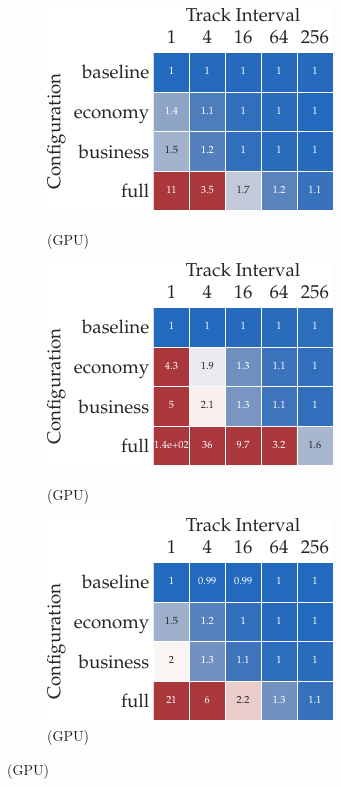 \captionsetup[subfigure]{justification=justified,singlelinecheck=false}

\begin{figure}[t]
  \centering
  \begin{subfigure}[t]{0.35\linewidth}
    \centering
    \caption{\mnist \MNISTNET (GPU)}
    \includegraphics{../repos/cockpit-paper/fig/01_benchmark/output/fig_grid/benchmark_mnist_logreg_cuda_app_thesis-wide}
    \label{cockpit::fig:app_benchmark_configurations_cuda-mnist_logreg}
  \end{subfigure}
  \hspace{0.1\linewidth}
  \begin{subfigure}[t]{0.35\linewidth}
    \centering
    \caption{\mnist \mlp (GPU)}
    \includegraphics{../repos/cockpit-paper/fig/01_benchmark/output/fig_grid/benchmark_mnist_mlp_cuda_app_thesis-wide}
    \label{cockpit::fig:app_benchmark_configurations_cuda-mnist_mlp}
  \end{subfigure}
  \begin{subfigure}[t]{0.35\linewidth}
    \centering
    \caption{\cifarten \threecthreed (GPU)}
    \includegraphics{../repos/cockpit-paper/fig/01_benchmark/output/fig_grid/benchmark_cifar10_3c3d_cuda_app_thesis-wide}

\end{subfigure}
\end{figure}
